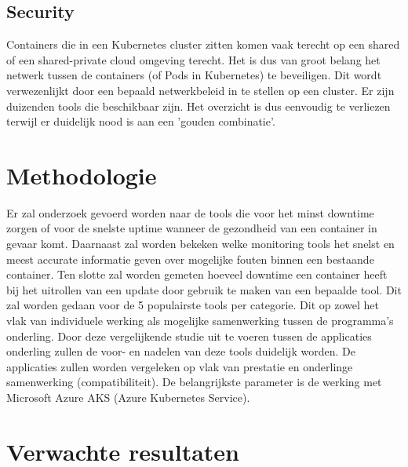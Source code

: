\subsection{Security}
Containers die in een Kubernetes cluster zitten komen vaak terecht op een shared of een shared-private cloud omgeving terecht. Het is dus van groot belang het netwerk tussen de containers (of Pods in Kubernetes) te beveiligen. Dit wordt verwezenlijkt door een bepaald netwerkbeleid in te stellen op een cluster.
Er zijn duizenden tools die beschikbaar zijn. Het overzicht is dus eenvoudig te verliezen terwijl er duidelijk nood is aan een 'gouden combinatie'.

\section{Methodologie}
\label{sec:methodologie}

Er zal onderzoek gevoerd worden naar de tools die voor het minst downtime zorgen of voor de snelste uptime wanneer de gezondheid van een container in gevaar komt. Daarnaast zal worden bekeken welke monitoring tools het snelst en meest accurate informatie geven over mogelijke fouten binnen een bestaande container. Ten slotte zal worden gemeten hoeveel downtime een container heeft bij het uitrollen van een update door gebruik te maken van een bepaalde tool. Dit zal worden gedaan voor de 5 populairste tools per categorie. Dit op zowel het vlak van individuele werking als mogelijke samenwerking tussen de programma's onderling. Door deze vergelijkende studie uit te voeren tussen de applicaties onderling zullen de voor- en nadelen van deze tools duidelijk worden. De applicaties zullen worden vergeleken op vlak van prestatie en onderlinge samenwerking (compatibiliteit). De belangrijkste parameter is de werking met Microsoft Azure AKS (Azure Kubernetes Service).


\section{Verwachte resultaten}
\label{sec:verwachte_resultaten}

